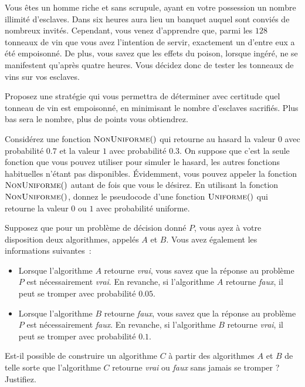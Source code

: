 \documentclass[12pt,addpoints]{exam}
\begin{document}
\begin{questions}
\question
Vous êtes un homme riche et sans scrupule, ayant en votre possession un nombre illimité d'esclaves. Dans six heures aura lieu un banquet auquel sont conviés de nombreux invités. Cependant, vous venez d'apprendre que, parmi les $128$ tonneaux de vin que vous avez l'intention de servir, exactement un d'entre eux a été empoisonné. De plus, vous savez que les effets du poison, lorsque ingéré, ne se manifestent qu'après quatre heures. Vous décidez donc de tester les tonneaux de vins sur vos esclaves.

Proposez une stratégie qui vous permettra de déterminer avec certitude quel tonneau de vin est empoisonné, en minimisant le nombre d'esclaves sacrifiés. Plus bas sera le nombre, plus de points vous obtiendrez.


\question
Considérez une fonction $\Call{NonUniforme}$ qui retourne au hasard la valeur $0$ avec probabilité $0.7$ et la valeur $1$ avec probabilité $0.3$. On suppose que c'est la seule fonction que vous pouvez utiliser pour simuler le hasard, les autres fonctions habituelles n'étant pas disponibles. Évidemment, vous pouvez appeler la fonction $\Call{NonUniforme}$ autant de fois que vous le désirez. En utilisant la fonction $\Call{NonUniforme}$, donnez le pseudocode d'une fonction $\Call{Uniforme}$ qui retourne la valeur $0$ ou $1$ avec probabilité uniforme.
\begin{solution}
\end{solution}

\question
Supposez que pour un problème de décision donné $P$, vous ayez à votre disposition deux algorithmes, appelés $A$ et $B$. Vous avez également les informations suivantes~:
\begin{itemize}
  \item Lorsque l'algorithme $A$ retourne \emph{vrai}, vous savez que la réponse au problème $P$ est nécessairement \emph{vrai}. En revanche, si l'algorithme $A$ retourne \emph{faux}, il peut se tromper avec probabilité $0.05$.
  \item Lorsque l'algorithme $B$ retourne \emph{faux}, vous savez que la réponse au problème $P$ est nécessairement \emph{faux}. En revanche, si l'algorithme $B$ retourne \emph{vrai}, il peut se tromper avec probabilité $0.1$.
\end{itemize}
Est-il possible de construire un algorithme $C$ à partir des algorithmes $A$ et $B$ de telle sorte que l'algorithme $C$ retourne \emph{vrai} ou \emph{faux} sans jamais se tromper ? Justifiez.


\end{questions}
\end{document}
